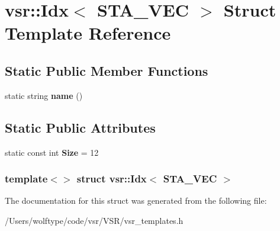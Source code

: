 \hypertarget{structvsr_1_1_idx_3_01_s_t_a___v_e_c_01_4}{\section{vsr\-:\-:Idx$<$ S\-T\-A\-\_\-\-V\-E\-C $>$ Struct Template Reference}
\label{structvsr_1_1_idx_3_01_s_t_a___v_e_c_01_4}
}
\subsection*{Static Public Member Functions}
\begin{DoxyCompactItemize}
\item 
\hypertarget{structvsr_1_1_idx_3_01_s_t_a___v_e_c_01_4_a1e5e5e8fcc5ea58e592cf8b9e56ae229}{static string {\bfseries name} ()}\label{structvsr_1_1_idx_3_01_s_t_a___v_e_c_01_4_a1e5e5e8fcc5ea58e592cf8b9e56ae229}

\end{DoxyCompactItemize}
\subsection*{Static Public Attributes}
\begin{DoxyCompactItemize}
\item 
\hypertarget{structvsr_1_1_idx_3_01_s_t_a___v_e_c_01_4_a32f79229a5f68d5dd3f94f0d725d6e1d}{static const int {\bfseries Size} = 12}\label{structvsr_1_1_idx_3_01_s_t_a___v_e_c_01_4_a32f79229a5f68d5dd3f94f0d725d6e1d}

\end{DoxyCompactItemize}
\subsubsection*{template$<$$>$ struct vsr\-::\-Idx$<$ S\-T\-A\-\_\-\-V\-E\-C $>$}



The documentation for this struct was generated from the following file\-:\begin{DoxyCompactItemize}
\item 
/\-Users/wolftype/code/vsr/\-V\-S\-R/vsr\-\_\-templates.\-h\end{DoxyCompactItemize}
